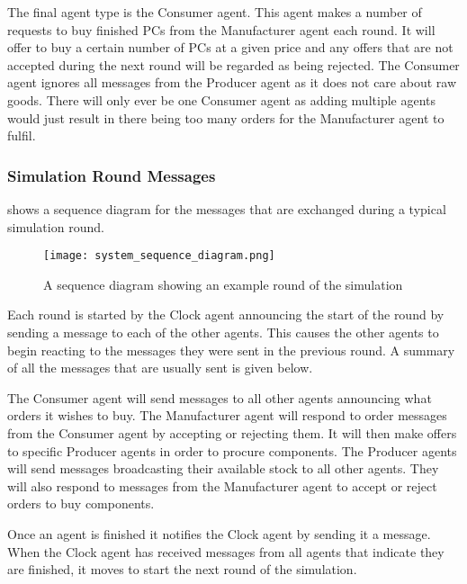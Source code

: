 The final agent type is the Consumer agent.
This agent makes a number of requests to buy finished PCs from the Manufacturer agent each round.
It will offer to buy a certain number of PCs at a given price and any offers that are not accepted during the next round will be regarded as being rejected.
The Consumer agent ignores all messages from the Producer agent as it does not care about raw goods.
There will only ever be one Consumer agent as adding multiple agents would just result in there being too many orders for the Manufacturer agent to fulfil.

\subsubsection{Simulation Round Messages}

 shows a sequence diagram for the messages that are exchanged during a typical simulation round.

\begin{figure}[h]
    \centering
    \caption{A sequence diagram showing an example round of the simulation}\label{fig:system_sequence_diagram}
    \texttt{[image: system\_sequence\_diagram.png]}
\end{figure}

Each round is started by the Clock agent announcing the start of the round by sending a message to each of the other agents.
This causes the other agents to begin reacting to the messages they were sent in the previous round.
A summary of all the messages that are usually sent is given below.

The Consumer agent will send messages to all other agents announcing what orders it wishes to buy.
The Manufacturer agent will respond to order messages from the Consumer agent by accepting or rejecting them.
It will then make offers to specific Producer agents in order to procure components.
The Producer agents will send messages broadcasting their available stock to all other agents.
They will also respond to messages from the Manufacturer agent to accept or reject orders to buy components.

Once an agent is finished it notifies the Clock agent by sending it a message.
When the Clock agent has received messages from all agents that indicate they are finished, it moves to start the next round of the simulation.
